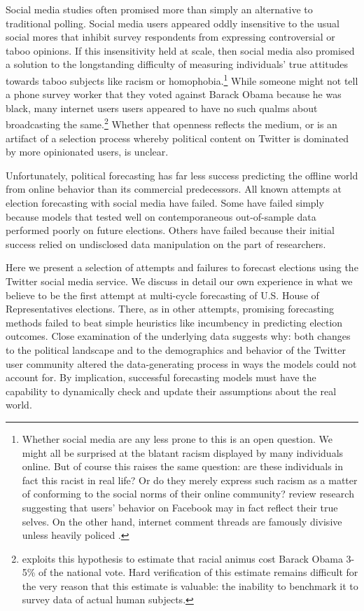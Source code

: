 \documentclass{article}
\begin{document}
Social media studies often promised more than simply an
alternative to traditional polling. Social media users appeared oddly
insensitive to the usual social mores that inhibit survey respondents from expressing
controversial or taboo opinions. If this insensitivity held at scale, then social
media also promised a solution to the longstanding
difficulty of measuring individuals' true attitudes towards taboo
subjects like racism or homophobia.\footnote{Whether social media are any less prone to this
is an open question. We might all be surprised at the blatant racism
displayed by many individuals online. But of course this raises the
same question: are these individuals in fact this racist in real life?
Or do they merely express such racism as a matter of conforming to the
social norms of their online community? \cite{wilson2012review}
review research suggesting that users' behavior on Facebook may in
fact reflect their true selves. On the other hand, internet comment
threads are famously divisive unless heavily policed \citep{binns2012don}.}  While someone might not tell a phone survey worker that they
voted against Barack Obama because he was black, many internet users
users appeared to have no such qualms about broadcasting the
same.\footnote{\cite{stephens2013cost} exploits this hypothesis to
  estimate that racial animus cost Barack Obama 3-5\% of the national
  vote. Hard verification of this estimate remains difficult for the
  very reason that this estimate is valuable: the inability to
  benchmark it to survey data of actual human subjects.} Whether that openness reflects the
medium, or is an artifact of a selection process whereby political
content on Twitter is dominated by more opinionated users, is unclear.

Unfortunately, political forecasting has far less success predicting
the offline world from online behavior than its commercial
predecessors. All known attempts at election forecasting with social
media have failed. Some have failed simply because models that tested
well on contemporaneous out-of-sample data performed poorly on future
elections. Others have failed because their initial success relied on
undisclosed data manipulation on the part of researchers.

Here we present a selection of attempts and failures to forecast
elections using the Twitter social media service. We discuss in detail
our own experience in what we believe to be the first attempt at
multi-cycle forecasting of U.S. House of Representatives
elections. There, as in other attempts, promising forecasting methods
failed to beat simple heuristics like incumbency in predicting
election outcomes. Close examination of the underlying data suggests
why: both changes to the political landscape and to the demographics
and behavior of the Twitter user community altered the data-generating
process in ways the models could not account for. By implication,
successful forecasting models must have the capability to dynamically
check and update their assumptions about the real world. 
\end{document}
